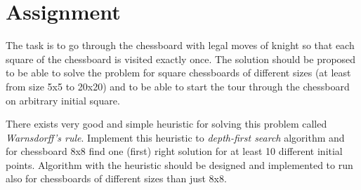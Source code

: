 \newpage

\section{Assignment}

The task is to go through the chessboard with legal moves of knight so that each square of the chessboard is visited exactly once. The solution should be proposed to be able to solve the problem for square chessboards of different sizes (at least from size 5x5 to 20x20) and to be able to start the tour through the chessboard on arbitrary initial square.

There exists very good and simple heuristic for solving this problem called \emph{Warnsdorff's rule}. Implement this heuristic to \emph{depth-first search} algorithm and for chessboard 8x8 find one (first) right solution for at least 10 different initial points. Algorithm with the heuristic should be designed and implemented to run also for chessboards of different sizes than just 8x8.